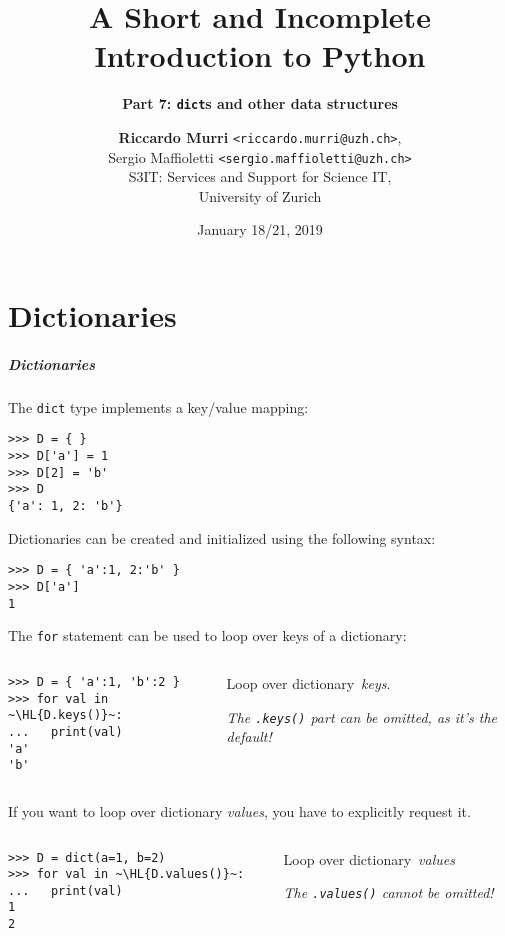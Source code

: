 \documentclass[english,serif,mathserif,xcolor=pdftex,dvipsnames,table]{beamer}
\title[7. Dictionaries]{%
  A Short and Incomplete Introduction to Python
}
\subtitle{\bfseries Part 7: \texttt{dict}s and other data structures}
\author[R.~Murri]{%
  \textbf{Riccardo Murri} \texttt{<riccardo.murri@uzh.ch>}, \\
  Sergio Maffioletti \texttt{<sergio.maffioletti@uzh.ch>}
  \\
  S3IT: Services and Support for Science IT,
  \\
  University of Zurich
}
\date{January 18/21, 2019}
\begin{document}
\maketitle


\part{Dictionaries}


\begin{frame}[fragile]
  \frametitle{Dictionaries}
  The \texttt{dict} type implements a key/value mapping:
\begin{lstlisting}
>>> D = { }
>>> D['a'] = 1
>>> D[2] = 'b'
>>> D
{'a': 1, 2: 'b'}
\end{lstlisting}

\+
  Dictionaries can be created and initialized using the following syntax:
\begin{lstlisting}
>>> D = { 'a':1, 2:'b' }
>>> D['a']
1
\end{lstlisting}
\end{frame}

\begin{frame}[fragile]
  The \texttt{for} statement can be used to loop over keys of a dictionary:
  \+
  \begin{columns}[c]
    \begin{column}{0.5\textwidth}
\begin{lstlisting}
>>> D = { 'a':1, 'b':2 }
>>> for val in ~\HL{D.keys()}~:
...   print(val)
'a'
'b'
\end{lstlisting}
    \end{column}
    \begin{column}{0.4\textwidth}
      \raggedleft
      Loop over dictionary~\emph{keys}.

      \emph{The \texttt{.keys()} part can be omitted, as it's the
        default!}
    \end{column}
  \end{columns}
\end{frame}

\begin{frame}[fragile]
  If you want to loop over dictionary \emph{values}, you have to
  explicitly request it.

  \+
  \begin{columns}[c]
    \begin{column}{0.5\textwidth}
\begin{lstlisting}
>>> D = dict(a=1, b=2)
>>> for val in ~\HL{D.values()}~:
...   print(val)
1
2
\end{lstlisting}
    \end{column}
    \begin{column}{0.4\textwidth}
      \raggedleft
      Loop over dictionary~\emph{values}

      \emph{The \texttt{.values()} cannot be omitted!}
    \end{column}
  \end{columns}
\end{frame}
\end{document}

